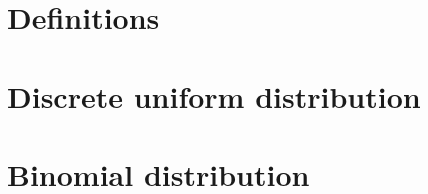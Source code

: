 \documentclass[12pt]{article}
\begin{document}
	
	\tableofcontents
	\pagebreak
	
	
	\section{Definitions}
	
	
	\section{Discrete uniform distribution}
	
	
	\section{Binomial distribution}
	
	
	
	
\end{document}
